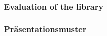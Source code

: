 \begin{frame}
    \frametitle{Evaluation of the library}
    
\end{frame}



\PraesentationStartseiteFlaggen



\PraesentationTitelseite %


\begin{frame}
\end{frame}

\PraesentationMasterWeissSchwarz

\begin{frame}
    \frametitle{Präsentationsmuster}
\end{frame}




